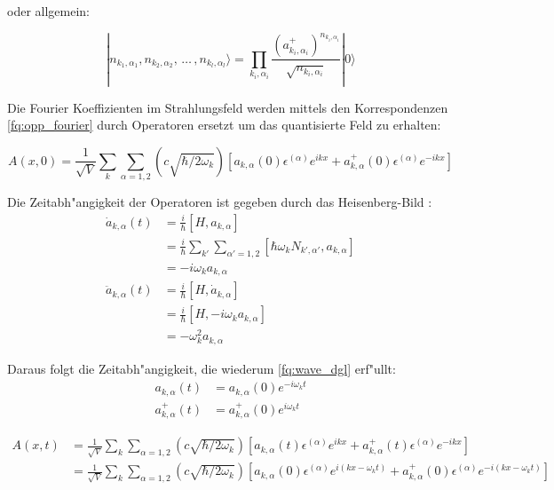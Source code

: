 oder allgemein:

\begin{equation}
|n_{k_1,\alpha_1}, n_{k_2,\alpha_2}, \, \hdots \, , n_{k_l,\alpha_l}\rangle =
 \prod_{k_i,\alpha_i}\frac{(a^+_{k_i,\alpha_i})^{n_{k_i,\alpha_i}}}{\sqrt{n_{k_i,\alpha_i}}} |0\rangle
\end{equation}

Die Fourier Koeffizienten im Strahlungsfeld werden mittels den Korrespondenzen \ref{fq:opp_fourier} durch Operatoren ersetzt um das quantisierte Feld zu erhalten:

\begin{equation}
A(x,0) = \frac{1}{\sqrt{V}} \sum_k \sum_{\alpha=1,2} \left(c \sqrt{\hbar/2 \omega_k}\right)\left[a_{k,\alpha}(0) \epsilon^{(\alpha)} e^{ikx} + a^+_{k,\alpha}(0) \epsilon^{(\alpha)} e^{-ikx}\right]
\end{equation}

Die Zeitabh"angigkeit der Operatoren ist gegeben durch das Heisenberg-Bild \cite{fq:heisenberg_picture}:
\begin{equation}
\begin{split}
\dot{a}_{k,\alpha}(t) &= \frac{i}{\hbar}[H,a_{k,\alpha}] \\
	&= \frac{i}{\hbar} \sum_{k'} \sum_{\alpha'=1,2} [\hbar \omega_k N_{k',\alpha'},a_{k,\alpha}]\\
	&= - i \omega_k a_{k,\alpha}\\
\ddot{a}_{k,\alpha}(t) &= \frac{i}{\hbar}[H,\dot{a}_{k,\alpha}] \\
	&= \frac{i}{\hbar}[H, - i \omega_k a_{k,\alpha}]\\
	&= - \omega_k^2 a_{k,\alpha}
\end{split}
\end{equation}

Daraus folgt die Zeitabh"angigkeit, die wiederum \ref{fq:wave_dgl} erf"ullt:
\begin{equation}
\begin{split}
a_{k,\alpha}(t) &= a_{k,\alpha}(0) e^{-i \omega_k t} \\
a^+_{k,\alpha}(t) &= a^+_{k,\alpha}(0) e^{i \omega_k t}
\end{split}
\end{equation}

\begin{equation}
\begin{split}
A(x,t) &= \frac{1}{\sqrt{V}} \sum_k \sum_{\alpha=1,2} \left(c \sqrt{\hbar/2 \omega_k}\right)\left[a_{k,\alpha}(t) \epsilon^{(\alpha)} e^{ikx} + a^+_{k,\alpha}(t) \epsilon^{(\alpha)} e^{-ikx}\right]\\
	&= \frac{1}{\sqrt{V}} \sum_k \sum_{\alpha=1,2} \left(c \sqrt{\hbar/2 \omega_k}\right)\left[a_{k,\alpha}(0) \epsilon^{(\alpha)} e^{i(kx-\omega_k t)} + a^+_{k,\alpha}(0) \epsilon^{(\alpha)} e^{-i(kx-\omega_k t)}\right]
\end{split}
\end{equation}

